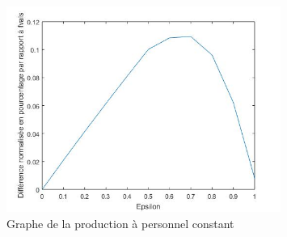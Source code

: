 
\begin{figure}[h]
    \centering
    \includegraphics[width=0.8\textwidth]{graphes/graphq5.jpg}
    \caption{Graphe de la production à personnel constant}
    \label{fig:q5}
\end{figure}
